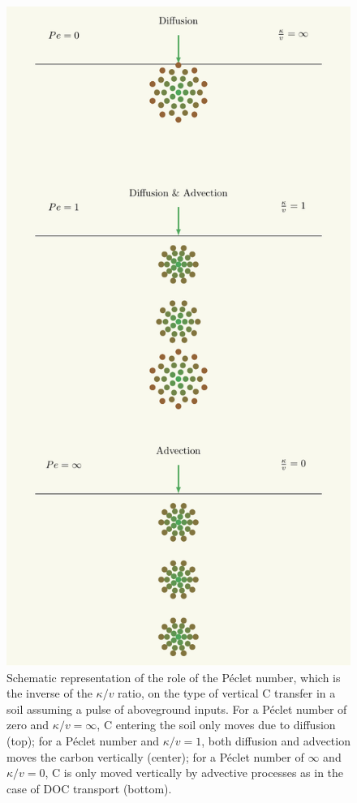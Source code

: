 \documentclass[11pt, oneside, a4paper]{article}   	%
\begin{document}
\begin{figure}[h]
   \centering
   \includegraphics[scale=0.8]{Figures/AdvectionDiffusion.pdf} %
   \caption{Schematic representation of the role of the Péclet number, which is the inverse of the $\kappa/v$ ratio, on the type of vertical C transfer in a soil assuming a pulse of aboveground inputs. For a Péclet number of zero and $\kappa/v = \infty$, C entering the soil only moves due to diffusion (top); for a Péclet number and $\kappa/v = 1$, both diffusion and advection moves the carbon vertically (center); for a Péclet number of $\infty$ and $\kappa/v = 0$, C is only moved vertically by advective processes as in the case of DOC transport (bottom). }
   \label{fig:Peclet}
\end{figure}
\end{document}
